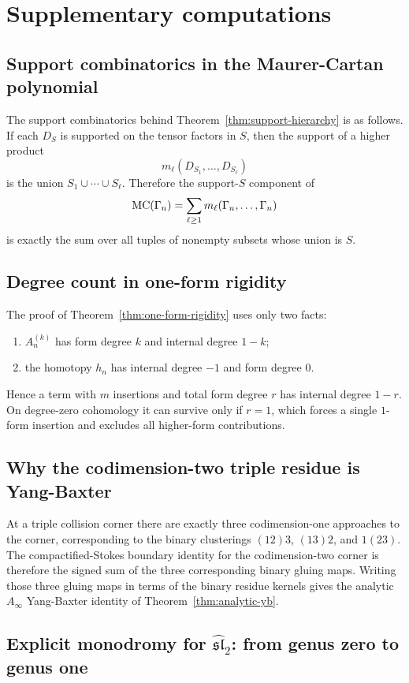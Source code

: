 \section{Supplementary computations}

\subsection{Support combinatorics in the Maurer-Cartan polynomial}
The support combinatorics behind Theorem~\ref{thm:support-hierarchy} is as follows. If each $D_S$ is supported on the tensor factors in $S$, then the support of a higher product
\[
 m_\ell(D_{S_1},\dots,D_{S_\ell})
\]
is the union $S_1\cup\cdots\cup S_\ell$. Therefore the support-$S$ component of
\[
 \mathrm{MC}(\Gamma_n)=\sum_{\ell\ge 1}m_\ell(\Gamma_n,\dots,\Gamma_n)
\]
is exactly the sum over all tuples of nonempty subsets whose union is $S$.

\subsection{Degree count in one-form rigidity}
The proof of Theorem~\ref{thm:one-form-rigidity} uses only two facts:
\begin{enumerate}[label=\textup{(\alph*)}]
 \item $A_n^{(k)}$ has form degree $k$ and internal degree $1-k$;
 \item the homotopy $h_n$ has internal degree $-1$ and form degree $0$.
\end{enumerate}
Hence a term with $m$ insertions and total form degree $r$ has internal degree $1-r$. On degree-zero cohomology it can survive only if $r=1$, which forces a single $1$-form insertion and excludes all higher-form contributions.

\subsection{Why the codimension-two triple residue is Yang-Baxter}
At a triple collision corner there are exactly three codimension-one approaches to the corner, corresponding to the binary clusterings $(12)3$, $(13)2$, and $1(23)$. The compactified-Stokes boundary identity for the codimension-two corner is therefore the signed sum of the three corresponding binary gluing maps. Writing those three gluing maps in terms of the binary residue kernels gives the analytic $A_\infty$ Yang-Baxter identity of Theorem~\ref{thm:analytic-yb}.

\subsection{Explicit monodromy for $\widehat{\mathfrak{sl}}_2$: from genus zero to genus one}
\label{subsec:explicit-monodromy-sl2}

